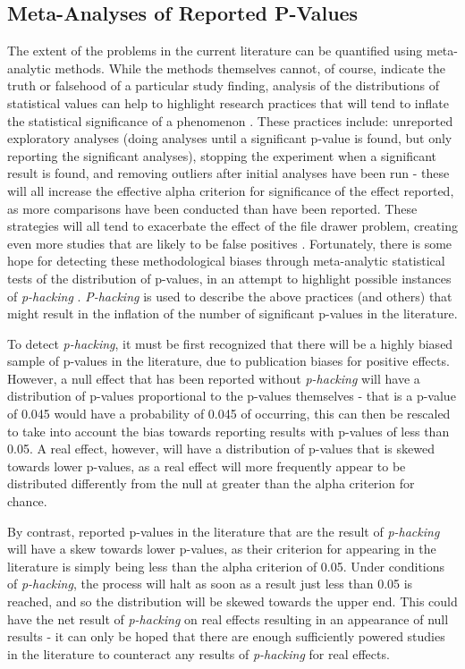 \documentclass[12pt,a4paper,titlepage]{scrreprt}
\begin{document}
\subsection{Meta-Analyses of Reported P-Values}
The extent of the problems in the current literature can be quantified using meta-analytic methods. While the methods themselves cannot, of course, indicate the truth or falsehood of a particular study finding, analysis of the distributions of statistical values can help to highlight research practices that will tend to inflate the statistical significance of a phenomenon \parencite{john_measuring_2012}. These practices include: unreported exploratory analyses (doing analyses until a significant p-value is found, but only reporting the significant analyses), stopping the experiment when a significant result is found, and removing outliers after initial analyses have been run - these will all increase the effective alpha criterion for significance of the effect reported, as more comparisons have been conducted than have been reported. These strategies will all tend to exacerbate the effect of the file drawer problem, creating even more studies that are likely to be false positives \parencite{bakker_rules_2012}.
Fortunately, there is some hope for detecting these methodological biases through meta-analytic statistical tests of the distribution of p-values, in an attempt to highlight possible instances of \textit{p-hacking} \parencite{simonsohn_p-curve:_2013}. \textit{P-hacking} is used to describe the above practices (and others) that might result in the inflation of the number of significant p-values in the literature.

To detect \textit{p-hacking}, it must be first recognized that there will be a highly biased sample of p-values in the literature, due to publication biases for positive effects. However, a null effect that has been reported without \textit{p-hacking} will have a distribution of p-values proportional to the p-values themselves - that is a p-value of 0.045 would have a probability of 0.045 of occurring, this can then be rescaled to take into account the bias towards reporting results with p-values of less than 0.05. A real effect, however, will have a distribution of p-values that is skewed towards lower p-values, as a real effect will more frequently appear to be distributed differently from the null at greater than the alpha criterion for chance.

By contrast, reported p-values in the literature that are the result of \textit{p-hacking} will have a skew towards lower p-values, as their criterion for appearing in the literature is simply being less than the alpha criterion of 0.05. Under conditions of \textit{p-hacking}, the process will halt as soon as a result just less than 0.05 is reached, and so the distribution will be skewed towards the upper end. This could have the net result of \textit{p-hacking} on real effects resulting in an appearance of null results - it can only be hoped that there are enough sufficiently powered studies in the literature to counteract any results of \textit{p-hacking} for real effects.
\end{document}
